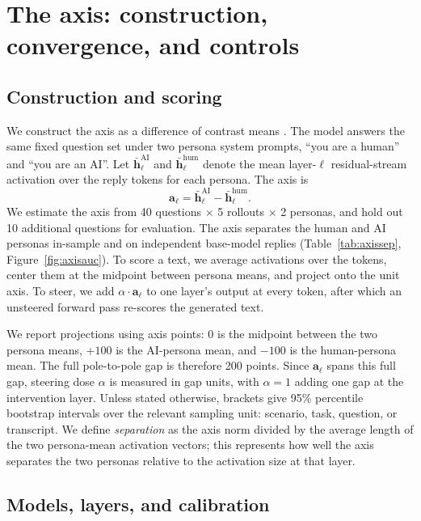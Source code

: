 \section{The axis: construction, convergence, and controls}
\label{sec:axis}

\subsection{Construction and scoring}

We construct the axis as a difference of contrast means
\citep{marks2023geometry, arditi2024refusal}. The model answers the same fixed
question set under two persona system prompts, ``you are a human'' and ``you
are an AI''. Let $\bar{\mathbf{h}}_{\ell}^{\mathrm{AI}}$ and
$\bar{\mathbf{h}}_{\ell}^{\mathrm{hum}}$ denote the mean layer-$\ell$
residual-stream activation over the reply tokens for each persona. The axis is
\begin{equation}
  \mathbf{a}_{\ell} = \bar{\mathbf{h}}_{\ell}^{\mathrm{AI}} - \bar{\mathbf{h}}_{\ell}^{\mathrm{hum}}.
  \label{eq:axis}
\end{equation}
We estimate the axis from 40 questions $\times$ 5 rollouts $\times$ 2 personas,
and hold out 10 additional questions for evaluation. The axis separates the
human and AI personas in-sample and on independent base-model replies
(Table~\ref{tab:axissep}, Figure~\ref{fig:axisauc}). To score a text, we average activations
over the tokens, center them at the midpoint between persona means, and
project onto the unit axis. To steer, we add $\alpha \cdot \mathbf{a}_{\ell}$
to one layer's output at every token, after which an unsteered forward
pass re-scores the generated text.

We report projections using axis points: 0 is the midpoint between the two
persona means, $+100$ is the AI-persona mean, and $-100$ is the human-persona
mean. The full pole-to-pole gap is therefore 200 points. Since
$\mathbf{a}_{\ell}$ spans this full gap, steering dose $\alpha$ is measured
in gap units, with $\alpha=1$ adding one gap at the intervention layer.
Unless stated otherwise, brackets give 95\% percentile bootstrap intervals over the
relevant sampling unit: scenario, task, question, or transcript. We define
\emph{separation} as the axis norm divided by the average length of the two
persona-mean activation vectors; this represents how well the axis separates
the two personas relative to the activation size at that layer.

\subsection{Models, layers, and calibration}

